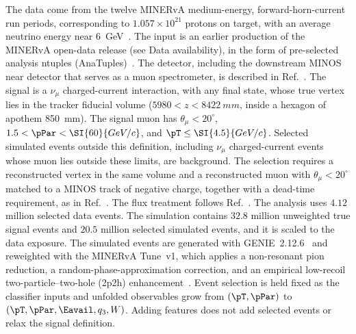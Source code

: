 The data come from the twelve MINERvA medium-energy, forward-horn-current run periods, corresponding to
$1.057\times10^{21}$ protons on target, with an average neutrino energy near \SI{6}{GeV}~\cite{MINERvA:2021owq}.
The input is an earlier production of the MINERvA open-data release (see Data availability), in the form of
pre-selected analysis ntuples (AnaTuples)~\cite{MINERvA:OpenData}.
The detector, including the downstream MINOS near detector that serves as a muon spectrometer, is described in
Ref.~\cite{MINERvA:2013zvz}.
The signal is a $\nu_{\mu}$ charged-current interaction, with any final state, whose true vertex lies in the
tracker fiducial volume ($5980<z<\SI{8422}{mm}$, inside a hexagon of apothem \SI{850}{mm}).
The signal muon has $\theta_{\mu}<20^{\circ}$, $1.5<\pPar<\SI{60}{GeV/c}$, and $\pT\le\SI{4.5}{GeV/c}$.
Selected simulated events outside this definition, including $\nu_{\mu}$ charged-current events whose muon lies
outside these limits, are background.
The selection requires a reconstructed vertex in the same volume and a reconstructed muon with
$\theta_{\mu}<20^{\circ}$ matched to a MINOS track of negative charge, together with a dead-time requirement, as in
Ref.~\cite{MINERvA:2021owq}.
The flux treatment follows Ref.~\cite{MINERvA:2016iqn}.
The analysis uses $4.12$ million selected data events.
The simulation contains $32.8$ million unweighted true signal events and $20.5$ million selected simulated events,
and it is scaled to the data exposure.
The simulated events are generated with GENIE~2.12.6~\cite{Andreopoulos:2009rq} and reweighted with the MINERvA
Tune~v1, which applies a non-resonant pion reduction, a random-phase-approximation correction, and an empirical
low-recoil two-particle--two-hole (2p2h) enhancement~\cite{MINERvA:2016lowrecoil}.
Event selection is held fixed as the classifier inputs and unfolded observables grow from $(\pT,\pPar)$ to
$(\pT,\pPar,\Eavail,q_3,W)$.
Adding features does not add selected events or relax the signal definition.


